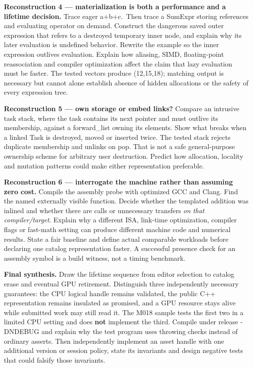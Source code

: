 \textbf{Reconstruction 4 --- materialization is both a performance and a lifetime decision.} Trace eager a+b+c.~Then trace a SumExpr storing references and evaluating operator\href{i}{} on demand. Construct the dangerous saved outer expression that refers to a destroyed temporary inner node, and explain why its later evaluation is undefined behavior. Rewrite the example so the inner expression outlives evaluation. Explain how aliasing, SIMD, floating-point reassociation and compiler optimization affect the claim that lazy evaluation must be faster. The tested vectors produce (12,15,18); matching output is necessary but cannot alone establish absence of hidden allocations or the safety of every expression tree.

\textbf{Reconstruction 5 --- own storage or embed links?} Compare an intrusive task stack, where the task contains its next pointer and must outlive its membership, against a forward\_list owning its elements. Show what breaks when a linked Task is destroyed, moved or inserted twice. The tested stack rejects duplicate membership and unlinks on pop. That is not a safe general-purpose ownership scheme for arbitrary user destruction. Predict how allocation, locality and mutation patterns could make either representation preferable.

\textbf{Reconstruction 6 --- interrogate the machine rather than assuming zero cost.} Compile the assembly probe with optimized GCC and Clang. Find the named externally visible function. Decide whether the templated addition was inlined and whether there are calls or unnecessary transfers \emph{on that compiler/target}. Explain why a different ISA, link-time optimization, compiler flags or fast-math setting can produce different machine code and numerical results. State a fair baseline and define actual comparable workloads before declaring one catalog representation faster. A successful presence check for an assembly symbol is a build witness, not a timing benchmark.

\textbf{Final synthesis.} Draw the lifetime sequence from editor selection to catalog erase and eventual GPU retirement. Distinguish three independently necessary guarantees: the CPU logical handle remains validated, the public C++ representation remains insulated as promised, and a GPU resource stays alive while submitted work may still read it. The M018 sample tests the first two in a limited CPU setting and does \textbf{not} implement the third. Compile under release -DNDEBUG and explain why the test program uses throwing checks instead of ordinary asserts. Then independently implement an asset handle with one additional version or session policy, state its invariants and design negative tests that could falsify those invariants.


